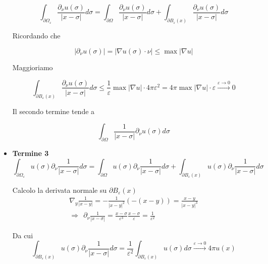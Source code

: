 \documentclass[10pt,a4paper,twoside,openright]{book}
\begin{document}
\begin{dimostrazione}
\begin{itemize}
		      \begin{equation*}
		      	\int _{\partial \Omega _{\varepsilon }}\frac{\partial _{\nu } u(\sigma)}{| x-\sigma | } d\sigma =\int _{\partial \Omega }\frac{\partial _{\nu } u(\sigma)}{| x-\sigma | } d\sigma +\int _{\partial B_{\varepsilon }(x)}\frac{\partial _{\nu } u(\sigma)}{| x-\sigma | } d\sigma 
		      \end{equation*}
		      
		      Ricordando che 
		      
		      \begin{equation*}
		      	| \partial _{\nu } u(\sigma)| =| \nabla u(\sigma) \cdotp \nu | \leqslant \max| \nabla u| 
		      \end{equation*}
		      
		      Maggioriamo
		      
		      \begin{equation*}
		      	\int _{\partial B_{\varepsilon }(x)}\frac{\partial _{\nu } u(\sigma)}{| x-\sigma | } d\sigma \leqslant \frac{1}{\varepsilon }\max| \nabla u| \cdotp 4\pi \varepsilon ^{2} = 4\pi \max| \nabla u| \cdotp \varepsilon \xrightarrow{\varepsilon \rightarrow 0} 0
		      \end{equation*}
		      
		      Il secondo termine tende a
		      
		      \begin{equation*}
		      	\int _{\partial \Omega }\frac{1}{| x-\sigma | } \partial _{\nu } u(\sigma) d\sigma 
		      \end{equation*}
		\item \textbf{Termine 3}\begin{equation*}
		      \int _{\partial \Omega _{\varepsilon }} u(\sigma) \partial _{\nu }\frac{1}{| x-\sigma | } d\sigma =\int _{\partial \Omega } u(\sigma) \partial _{\nu }\frac{1}{| x-\sigma | } d\sigma +\int _{\partial B_{\varepsilon }(x)} u(\sigma) \partial _{\nu }\frac{1}{| x-\sigma | } d\sigma 
		\end{equation*}
		
		Calcolo la derivata normale su $\displaystyle \partial B_{\varepsilon }(x)$\begin{gather*}
		\nabla _{y}\frac{1}{| x-y| } =-\frac{1}{| x-y| ^{2}}(-(x-y)) =\frac{x-y}{| x-y| ^{3}}\\
		\Rightarrow \ \ \partial _{\nu }\frac{1}{| x-\sigma | } =\frac{x-\sigma }{\varepsilon ^{3}}\frac{x-\sigma }{\varepsilon } =\frac{1}{\varepsilon ^{2}}
		\end{gather*}
		
		Da cui\begin{equation*}
		\int _{\partial B_{\varepsilon }(x)} u(\sigma) \partial _{\nu }\frac{1}{| x-\sigma | } d\sigma =\frac{1}{\varepsilon ^{2}}\int _{\partial B_{\varepsilon }(x)} u(\sigma) d\sigma \xrightarrow{\varepsilon \rightarrow 0} 4\pi u(x)
		\end{equation*}
	\end{itemize}
\end{dimostrazione}
\end{document}
